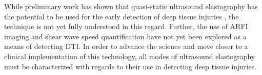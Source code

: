 		While preliminary work has shown that quasi-static ultrasound elastography has the potential to be used for the early detection of deep tissue injuries \cite{deprez11}, the technique is not yet fully understood in this regard. Further, the use of ARFI imaging and shear wave speed quantification have not yet been explored as a means of detecting DTI. In order to advance the science and move closer to a clinical implementation of this technology, all modes of ultrasound elastography must be characterized with regards to their use in detecting deep tissue injuries.

